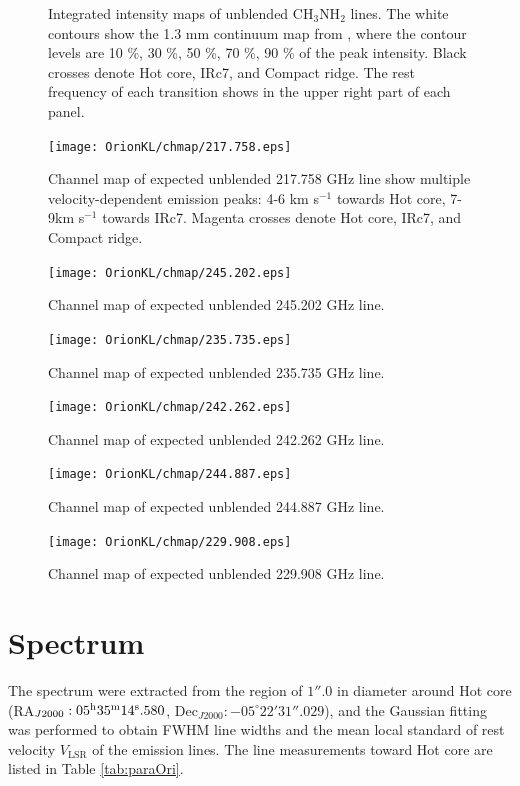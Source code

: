 \begin{figure}[H]
\begin{center}
\caption{Integrated intensity maps of unblended CH$_{3}$NH$_{2}$ lines. 
The white contours show the 1.3 mm continuum map from \citet{Hirota+2015},
where the contour levels are 10 \%, 30 \%, 50 \%, 70 \%, 90 \% of the peak intensity.
Black crosses denote Hot core, IRc7, and Compact ridge. 
The rest frequency of each transition shows in the upper right part of each panel.}
\end{center}
\end{figure}

\begin{figure}[H]
  \centering
  \texttt{[image: OrionKL/chmap/217.758.eps]}
  \caption{
  Channel map of expected unblended 217.758 GHz line show multiple velocity-dependent 
  emission peaks: 4-6 km s$^{-1}$ towards Hot core, 7-9km s$^{-1}$ towards IRc7. 
  Magenta crosses denote Hot core, IRc7, and Compact ridge.}
  \label{ch_0}
\end{figure}

\begin{figure}[H]
  \centering
  \texttt{[image: OrionKL/chmap/245.202.eps]}
  \caption{Channel map of expected unblended 245.202 GHz line.}
  \label{ch_1}
\end{figure}

\begin{figure}[H]
  \centering
  \texttt{[image: OrionKL/chmap/235.735.eps]}
  \caption{Channel map of expected unblended 235.735 GHz line.}
  \label{ch_2}
\end{figure}

\begin{figure}[H]
  \centering
  \texttt{[image: OrionKL/chmap/242.262.eps]}
  \caption{Channel map of expected unblended 242.262 GHz line.}
  \label{ch_3}
\end{figure}

\begin{figure}[H]
  \centering
  \texttt{[image: OrionKL/chmap/244.887.eps]}
  \caption{Channel map of expected unblended 244.887 GHz line.}
  \label{ch_5}
\end{figure}

\begin{figure}[H]
  \centering
  \texttt{[image: OrionKL/chmap/229.908.eps]}
  \caption{Channel map of expected unblended 229.908 GHz line.}
  \label{ch_7}
\end{figure}

\newpage
\section{Spectrum}
The spectrum were extracted from the region of $1''.0$ in diameter around 
Hot core (RA$_{J2000}: 05^{\rm{h}}35^{\rm{m}}14^{\rm{s}}.580$, Dec$_{J2000}:-05^{\circ}22'31''.029$), 
and the Gaussian fitting was performed to obtain FWHM line widths and the mean local standard of 
rest velocity $V_{\mathrm{LSR}}$ of the emission lines.
The line measurements toward Hot core are listed in Table \ref{tab:paraOri}.


